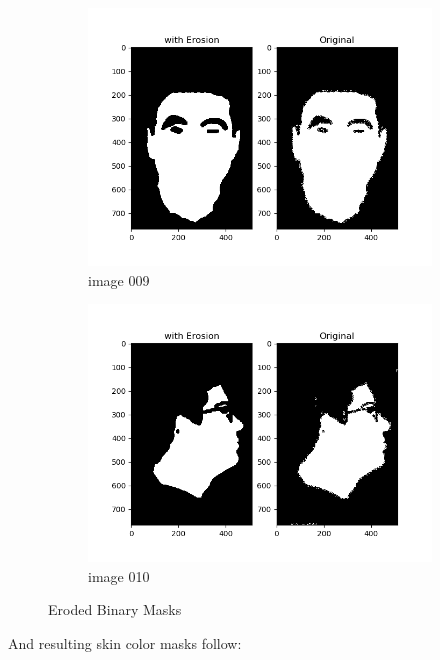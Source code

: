 \documentclass[11pt]{report}
\begin{document}
\begin{figure}[H]
\begin{subfigure}{0.3\textwidth}
        \includegraphics[width=\textwidth]{Task 2 Plots/bin_mask_erode_009.png}
        \caption{image 009}
        \label{fig:binmask_erode9}
    \end{subfigure}
    \begin{subfigure}{0.3\textwidth}
        \centering
        \includegraphics[width=\textwidth]{Task 2 Plots/bin_mask_erode_010.png}
        \caption{image 010}
        \label{fig:binmask_erode10}
    \end{subfigure}
    \caption{Eroded Binary Masks}
    \label{fig:binmaskerodedall}
\end{figure}

And resulting skin color masks follow:
\end{document}
